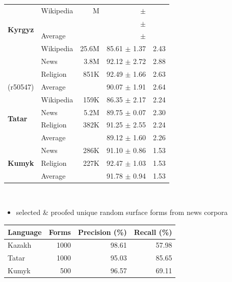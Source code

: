 \documentclass[fontscale=0.3,landscape,paperwidth=72in,paperheight=36in]{baposter}  %
\newcommand{\hiliteone}[1]{{\addfontfeature{Color=06821699}#1}}
\newcommand{\htwo}[1]{{\htwofont \textbf{\dotfill{}#1\dotfill{}}}}
\begin{document}
\begin{poster}
{{\begin{tabular}{llrrr}
				\multirow{4}{*}{\textbf{Kyrgyz}} & Wikipedia & M &  $\pm$  &  \\
					&  &  &  $\pm$  &  \\\cmidrule{2-5}
				 (r54474) & Average &  & \hiliteone{} $\pm$  &  \\
				\midrule
				\multirow{4}{*}{\textbf{Kazakh}} & Wikipedia & 25.6M & 85.61 $\pm$ 1.37 & 2.43 \\
					& News & 3.8M & 92.12 $\pm$ 2.72  & 2.88 \\
					& Religion & 851K & 92.49 $\pm$ 1.66  & 2.63 \\\cmidrule{2-5}
				 (r50547) & Average &  & \hiliteone{90.07} $\pm$ 1.91  & 2.64\\
				\midrule
				\multirow{4}{*}{\textbf{Tatar}} & Wikipedia & 159K & 86.35 $\pm$ 2.17  & 2.24\\
					& News & 5.2M & 89.75 $\pm$ 0.07  & 2.30 \\
					& Religion & 382K & 91.25 $\pm$ 2.55 & 2.24 \\\cmidrule{2-5}
				 (r50260) & Average &  & \hiliteone{89.12} $\pm$ 1.60 & 2.26 \\
				\midrule
				\multirow{3}{*}{\textbf{Kumyk}} & News & 286K &  91.10 $\pm$ 0.86  & 1.53 \\
					& Religion & 227K & 92.47 $\pm$ 1.03  & 1.53 \\\cmidrule{2-5}
				 (r50300) & Average &  & \hiliteone{91.78} $\pm$ 0.94 & 1.53 \\
				\bottomrule
			\end{tabular}\\
		}


			\vspace{0.425em}
			\begin{itemize}
				\item {}{\footnotesize selected \& proofed unique random surface forms from news corpora}
			\end{itemize}


			\vspace{-1em}
			\begin{center}
				\begin{tabular}{lrrr}
				\toprule
					\textbf{Language} & \textbf{Forms} & \textbf{Precision} (\%) & \textbf{Recall} (\%) \\
				\midrule
					Kazakh & 1000 & 98.61 &  57.98 \\
					Tatar & 1000 & 95.03 & 85.65 \\
					Kumyk & 500 & 96.57 & 69.11 \\
				\bottomrule
				\end{tabular}
			\end{center}

}
\end{poster}
\end{document}
